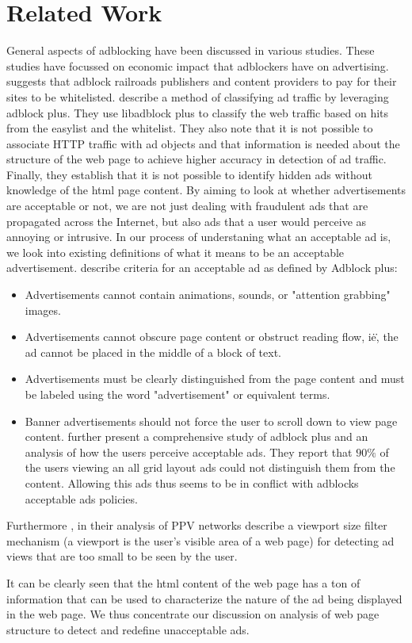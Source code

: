 \section{{\secit Related Work}}
 General aspects of adblocking have been discussed in various studies. These studies have focussed on economic impact that adblockers have on advertising.  \cite{DigitalTrends} suggests that adblock railroads publishers and content providers to pay for their sites to be whitelisted.
\cite{pujol2015annoyed} describe a method of classifying ad traffic by leveraging adblock plus. They use libadblock plus to classify the web traffic based on hits from the easylist and the whitelist. They also note that it is not possible to associate HTTP traffic with ad objects and that information is needed about the structure of the web page to achieve higher accuracy in detection of ad traffic. Finally, they establish that it is not possible to identify hidden ads without knowledge of the html page content.
By aiming to look at whether advertisements are acceptable or not, we are not just dealing with fraudulent ads that are propagated across the Internet, but also ads that a user would perceive as annoying or intrusive. In our process of understaning what an acceptable ad is, we look into existing definitions of what it means to be an acceptable advertisement.
\cite{walls2015measuring} describe criteria for an acceptable ad as defined by Adblock plus:
\begin{itemize}
\item Advertisements cannot contain animations, sounds, or "attention grabbing" images.
\item Advertisements cannot obscure page content or obstruct reading flow, i\.e\., the ad cannot be placed in the middle of a block
of text.
\item Advertisements must be clearly distinguished from the page
content and must be labeled using the word "advertisement"
or equivalent terms.
\item Banner advertisements should not force the user to scroll
down to view page content.
\cite{walls2015measuring} further present a comprehensive study of adblock plus and  an analysis of how the users perceive acceptable ads. They report that $ 90 \% $ of the users viewing an all grid layout ads could not distinguish them from the content. Allowing this ads thus seems to be in conflict with adblocks acceptable ads policies.
\end{itemize}

Furthermore , in their analysis of PPV networks \cite{springborn2013impression} describe a viewport size filter mechanism (a viewport is the user's visible area of a web page) for detecting ad views that are too small to be seen by the user.

It can be clearly seen that the html content of the web page has a ton of information that can be used to characterize the nature of the ad being displayed in the web page.
We thus concentrate our discussion on analysis of web page structure to detect and redefine unacceptable ads.
